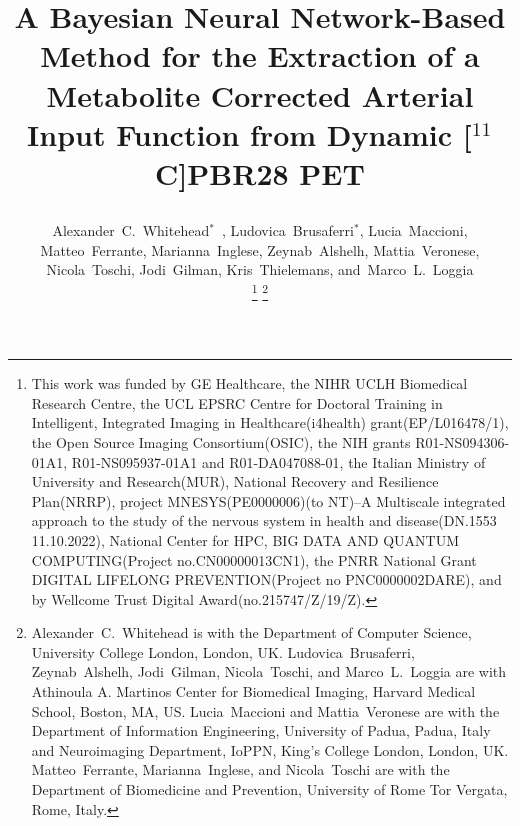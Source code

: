 \documentclass{IEEEtran}
\begin{document}
    \title{
        \vspace{-0.75cm}
        
        A Bayesian Neural Network-Based Method for the Extraction of a Metabolite Corrected Arterial Input Function from Dynamic [$^{11}$C]PBR28 PET 
    }
    
    \author{
        \vspace{-0.25cm}
        
        Alexander~C.~Whitehead$^{*}$~,
        Ludovica~Brusaferri$^{*}$,
        Lucia~Maccioni,
        Matteo~Ferrante,
        Marianna~Inglese,
        Zeynab~Alshelh,
        Mattia~Veronese,
        Nicola~Toschi,
        Jodi~Gilman,
        Kris~Thielemans,
        and~Marco~L.~Loggia
    
        \vspace{-0.75cm}
    
        \thanks{
            \scriptsize
            This work was funded by GE Healthcare, the NIHR UCLH Biomedical Research Centre, the UCL EPSRC Centre for Doctoral Training in Intelligent, Integrated Imaging in Healthcare(i4health) grant(EP/L016478/1), the Open Source Imaging Consortium(OSIC), the NIH grants R01-NS094306-01A1, R01-NS095937-01A1 and R01-DA047088-01, the Italian Ministry of University and Research(MUR), National Recovery and Resilience Plan(NRRP), project MNESYS(PE0000006)(to NT)–A Multiscale integrated approach to the study of the nervous system in health and disease(DN.1553 11.10.2022), National Center for HPC, BIG DATA AND QUANTUM COMPUTING(Project no.CN00000013CN1), the PNRR National Grant DIGITAL LIFELONG PREVENTION(Project no PNC0000002DARE), and by Wellcome Trust Digital Award(no.215747/Z/19/Z).
        }
        \thanks{
            \scriptsize
            Alexander~C.~Whitehead is with the Department of Computer Science, University College London, London, UK. Ludovica~Brusaferri, Zeynab~Alshelh, Jodi~Gilman, Nicola~Toschi, and Marco~L.~Loggia are with Athinoula A. Martinos Center for Biomedical Imaging, Harvard Medical School, Boston, MA, US. Lucia~Maccioni and Mattia~Veronese are with the Department of Information Engineering, University of Padua, Padua, Italy and Neuroimaging Department, IoPPN, King’s College London, London, UK. Matteo~Ferrante, Marianna~Inglese, and Nicola~Toschi are with the Department of Biomedicine and Prevention, University of Rome Tor Vergata, Rome, Italy.
        }
    }
    
    \pagestyle{plain}
    
\end{document}
